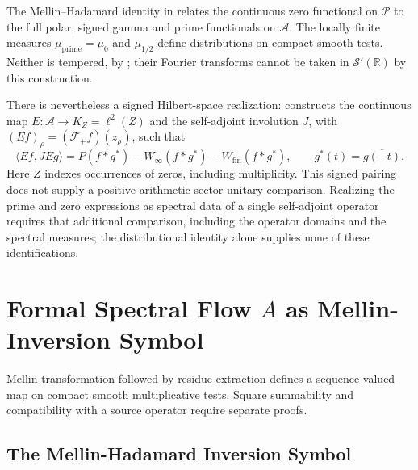 \begin{remark}
\label{v4-arith:w9-r4:rem:duality-distributional}
The Mellin--Hadamard identity in
 relates the continuous zero
functional on \(\mathscr P\) to the full polar, signed gamma and
prime functionals on \(\mathscr A\). The locally finite measures
\(\mu_{\mathrm{prime}}=\mu_0\) and \(\mu_{1/2}\) define distributions
on compact smooth tests. Neither is tempered, by
; their Fourier transforms cannot be taken
in \(\mathscr S'(\mathbb R)\) by this construction.

There is nevertheless a signed Hilbert-space realization:
 constructs the continuous
map \(E:\mathscr A\to K_Z=\ell^2(Z)\) and the self-adjoint involution
\(J\), with \((Ef)_\rho=(\mathcal F_+f)(z_\rho)\), such that
\[
 \langle Ef,JEg\rangle
 =P(f*g^*)-W_\infty(f*g^*)-W_{\mathrm{fin}}(f*g^*),
 \qquad g^*(t)=\overline{g(-t)}.
\]
Here \(Z\) indexes occurrences of zeros, including multiplicity.
This signed pairing does not supply a positive arithmetic-sector
unitary comparison. Realizing the prime and zero expressions as
spectral data of a single self-adjoint operator requires that
additional comparison, including the operator domains and the
spectral measures; the distributional identity alone supplies none
of these identifications.
\end{remark}

\section{Formal Spectral Flow \(A\) as Mellin-Inversion Symbol}
\label{v4-arith:w9-r4:formal-flow}

Mellin transformation followed by residue extraction defines a
sequence-valued map on compact smooth multiplicative tests.
Square summability and compatibility with a source operator require
separate proofs.

\subsection{The Mellin-Hadamard Inversion Symbol}
\label{v4-arith:w9-r4:formal-flow:symbol}

